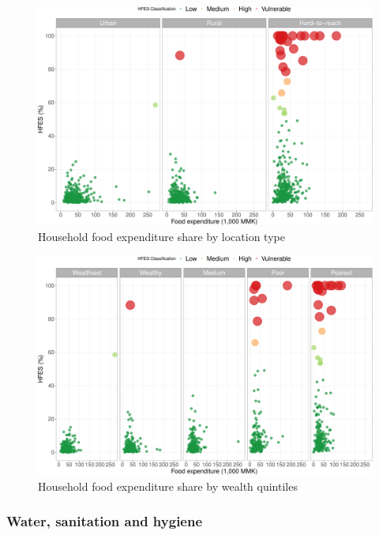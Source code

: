 \documentclass[12pt,a4paper]{article}
\begin{document}
\newpage

\begin{figure}[H]

{\centering \includegraphics{kayahReport_files/figure-latex/hfesScatterPlot1-1} 

}

\caption{Household food expenditure share by location type}\label{fig:hfesScatterPlot1}
\end{figure}

\begin{figure}[H]

{\centering \includegraphics{kayahReport_files/figure-latex/hfesScatterPlot2-1} 

}

\caption{Household food expenditure share by wealth quintiles}\label{fig:hfesScatterPlot2}
\end{figure}

\hypertarget{wash-results}{%
\subsubsection{Water, sanitation and hygiene}\label{wash-results}}
\end{document}
